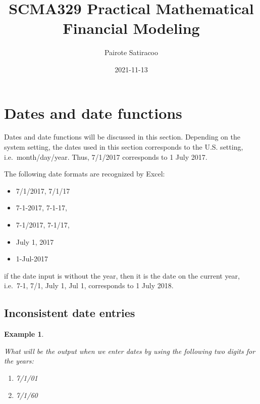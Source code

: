 \documentclass[
]{article}
\title{SCMA329 Practical Mathematical Financial Modeling}
\author{Pairote Satiracoo}
\date{2021-11-13}
\theoremstyle{definition}
\theoremstyle{definition}
\newtheorem{example}{Example}[section]
\theoremstyle{definition}
\theoremstyle{definition}
\theoremstyle{remark}
\begin{document}
\maketitle

{
\setcounter{tocdepth}{2}
\tableofcontents
}
\hypertarget{dates-and-date-functions}{%
\section{Dates and date functions}\label{dates-and-date-functions}}

Dates and date functions will be discussed in this section. Depending on
the system setting, the dates used in this section corresponds to the
U.S. setting, i.e.~month/day/year. Thus, 7/1/2017 corresponds to 1 July
2017.

The following date formats are recognized by Excel:

\begin{itemize}
\item
  7/1/2017, 7/1/17
\item
  7-1-2017, 7-1-17,
\item
  7-1/2017, 7-1/17,
\item
  July 1, 2017
\item
  1-Jul-2017
\end{itemize}

if the date input is without the year, then it is the date on the
current year, i.e.~7-1, 7/1, July 1, Jul 1, corresponds to 1 July 2018.

\hypertarget{inconsistent-date-entries}{%
\subsection{Inconsistent date entries}\label{inconsistent-date-entries}}

\begin{example}
\protect\hypertarget{exm:unlabeled-div-1}{}\label{exm:unlabeled-div-1}

\emph{What will be the output when we enter dates by using the
following two digits for the years:}

\begin{enumerate}
\def\labelenumi{\arabic{enumi}.}
\item
  \emph{7/1/01}
\item
  \emph{7/1/60}
\end{enumerate}

\end{example}
\end{document}
